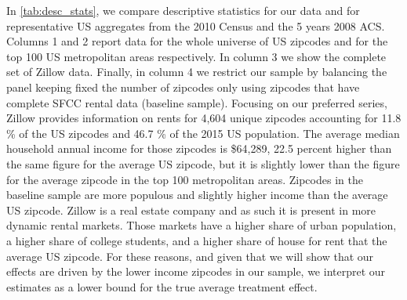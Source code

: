 In \autoref{tab:desc_stats}, we compare descriptive statistics for our data and for representative 
US aggregates from the 2010 Census and the 5 years 2008 ACS. Columns 1 and 2 report data for the 
whole universe of US zipcodes and for the top 100 US metropolitan areas respectively. In column 3 
we show the complete set of Zillow data. Finally, in column 4 we restrict our sample by balancing 
the panel keeping fixed the number of zipcodes only using zipcodes that have complete SFCC rental 
data (baseline sample). Focusing on our preferred series, Zillow provides information on rents for 
4,604 unique zipcodes accounting for 11.8 \% of the US zipcodes and 46.7 \% of the 2015 US population. 
The average median household annual income for those zipcodes is \$64,289, 22.5 percent higher than 
the same figure for the average US zipcode, but it is slightly lower than the figure for the average 
zipcode in the top 100 metropolitan areas. Zipcodes in the baseline sample are more populous and 
slightly higher income than the average US zipcode. Zillow is a real estate company and as such it 
is present in more dynamic rental markets. Those markets have a higher share of urban population, a 
higher share of college students, and a higher share of house for rent that the average US zipcode. 
For these reasons, and given that we will show that our effects are driven by the lower income 
zipcodes in our sample, we interpret our estimates as a lower bound for the true average treatment 
effect.


